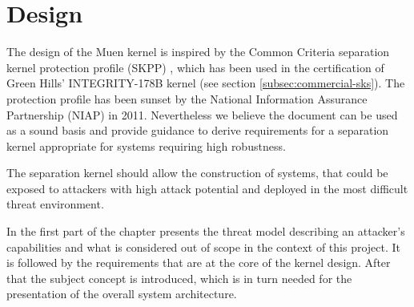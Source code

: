 \chapter{Design}\label{chap:design}
The design of the Muen kernel is inspired by the Common Criteria separation
kernel protection profile (SKPP) \cite{SKPP}, which has been used in the
certification of Green Hills' INTEGRITY-178B kernel (see section
\ref{subsec:commercial-sks}). The protection profile has been sunset by the
National Information Assurance Partnership (NIAP) in 2011. Nevertheless we
believe the document can be used as a sound basis and provide guidance to
derive requirements for a separation kernel appropriate for systems requiring
high robustness.

The separation kernel should allow the construction of systems, that could be
exposed to attackers with high attack potential and deployed in the most
difficult threat environment.

In the first part of the chapter presents the threat model describing an
attacker's capabilities and what is considered out of scope in the context of
this project. It is followed by the requirements that are at the core of the
kernel design. After that the subject concept is introduced, which is in turn
needed for the presentation of the overall system architecture.





